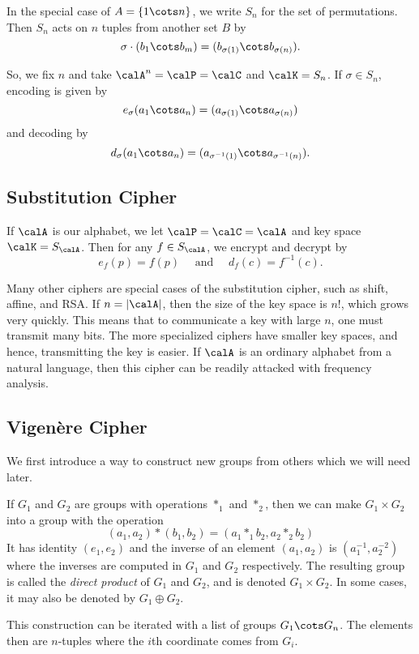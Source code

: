 \documentclass[12pt]{amsart}
\theoremstyle{plain}
\theoremstyle{definition}
\theoremstyle{remark}
\begin{document}
In the special case of $A=\{1\cots n\}$, we write $S_n$ for the set of
permutations.  Then $S_n$ acts on $n$ tuples from another set $B$ by
\[ \sigma \cdot (b_1\cots b_m) = (b_{\sigma(1)}\cots b_{\sigma(n)}).\]

So, we fix $n$ and take $\calA^n=\calP=\calC$ and $\calK=S_{n}$.  If
$\sigma\in S_n$, encoding is given by
\[ e_\sigma(a_1\cots a_n) = (a_{\sigma(1)}\cots a_{\sigma(n)})\]
and decoding by
\[ d_\sigma(a_1\cots a_n) = (a_{\sigma^{-1}(1)}\cots a_{\sigma^{-1}(n)}).\]

\subsection{Substitution Cipher}


If $\calA$ is our alphabet, we let $\calP=\calC=\calA$ and key space
$\calK=S_\calA$. 
Then for any $f\in S_\calA$, we encrypt and decrypt by
\[ e_f(p) = f(p) \quad\text{ and }\quad d_f(c) = f^{-1}(c).\]

Many other ciphers are special cases of the substitution cipher, such
as shift, affine, and RSA.  If $n=|\calA|$, then the size of the key
space is $n!$, which grows very quickly.  This means that to
communicate a key with large $n$, one must transmit many bits.  The
more specialized ciphers have smaller key spaces, and hence,
transmitting the key is easier.  If $\calA$ is an ordinary alphabet
from a natural language, then this cipher can be readily attacked with
frequency analysis.

\subsection{Vigen\`ere Cipher}
\label{vigenere}
We first introduce a way to construct new groups from others which
we will need later.

If $G_1$ and $G_2$ are groups with operations $*_1$ and $*_2$, then
we can make $G_1\times G_2$ into a group with the operation
\[ (a_1,a_2)*(b_1,b_2) = (a_1*_1 b_2, a_2*_2 b_2) \]
It has identity $(e_1, e_2)$ and the inverse of an element $(a_1,a_2)$
is $(a_1^{-1}, a_2^{-2})$ where the inverses are computed in $G_1$
and $G_2$ respectively.  The resulting group is called the {\em
direct product} of $G_1$ and $G_2$, and is denoted $G_1\times G_2$.
In some cases, it may also be denoted by $G_1\oplus G_2$.

This construction can be iterated with a list of groups
$G_1\cots G_n$.  The elements then are $n$-tuples where the $i$th
coordinate comes from $G_i$.
\end{document}
